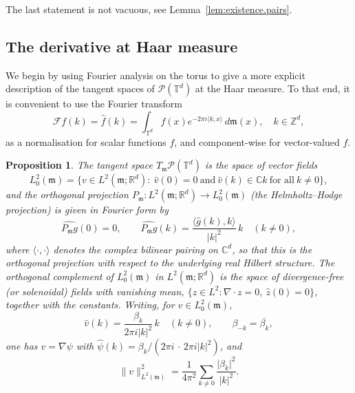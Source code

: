 \documentclass[11pt,reqno]{amsart}
\theoremstyle{plain}
\newtheorem{prp}[thm]{Proposition}
\theoremstyle{definition}
\newcommand{\T}{\mathbb{T}}
\newcommand{\Z}{\mathbb{Z}}
\newcommand{\R}{\mathbb{R}}
\newcommand{\C}{\mathbb{C}}
\newcommand{\Leb}{\mathfrak{m}}
\newcommand{\Prob}{\mathcal{P}}
\begin{document}
The last statement is not vacuous, see Lemma~\ref{lem:existence.pairs}.

\subsection{The derivative at Haar measure}
\label{sec:derivative.haar}

We begin by using Fourier analysis on the torus to give a more explicit description of the tangent spaces of \( \Prob(\T^d) \) at the Haar measure.
To that end, it is convenient to use the Fourier transform
\[
    \mathcal{F}f(k) = \hat f(k)=\int_{\T^d}f(x)e^{-2\pi i\langle k,x\rangle}\,d\Leb(x), \quad k\in\Z^d,
\]
as a normalisation for scalar functions \(f\), and  component-wise for vector-valued \( f \).

\begin{prp}\label{prp:fourier.model}
    The tangent space \(T_\Leb \Prob(\T^d)\) is the space of vector fields
    \[
        L^2_0(\Leb)=\Big\{v\in L^2(\Leb;\R^d):\ \hat v(0)=0\ \text{and}\
        \hat v(k)\in\C k\ \text{for all}\ k\neq0\Big\},
    \]
    and the orthogonal projection \( P_\Leb:L^2(\Leb;\R^d)\to L^2_0(\Leb) \) (the \emph{Helmholtz--Hodge projection}) is given in Fourier form by
    \[
        \widehat{P_\Leb g}(0)=0,\qquad
        \widehat{P_\Leb g}(k)=\frac{\langle \hat g(k),k\rangle}{\lvert k \rvert^2}\,k\quad(k\neq0),
    \]
    where \( \langle\cdot,\cdot\rangle \) denotes the complex bilinear pairing on \( \C^d \), so that this is the orthogonal projection with respect to the underlying real Hilbert structure.
    The orthogonal complement of \( L^2_0(\Leb) \) in \( L^2(\Leb;\R^d) \) is the space of divergence-free (or \emph{solenoidal}) fields with vanishing mean, \( \{z\in L^2:\nabla\cdot z=0,\ \hat z(0)=0\} \), together with the constants.
    Writing, for \( v\in L^2_0(\Leb) \),
    \begin{equation}\label{eq:beta.coordinates}
        \hat v(k)=\frac{\beta_k}{2\pi i\lvert k \rvert^2}\,k\quad(k\neq0),\qquad \beta_{-k}=\overline{\beta_k},
    \end{equation}
    one has \( v=\nabla\psi \) with \( \hat\psi(k)=\beta_k/(2\pi i\,\cdot\,2\pi i\lvert k \rvert^2) \), and
    \begin{equation}\label{eq:beta.norm}
        \lVert v \rVert_{L^2(\Leb)}^2=\frac{1}{4\pi^2}\sum_{k\neq0}\frac{\lvert \beta_k \rvert^2}{\lvert k \rvert^2}.
    \end{equation}
\end{prp}
\end{document}
